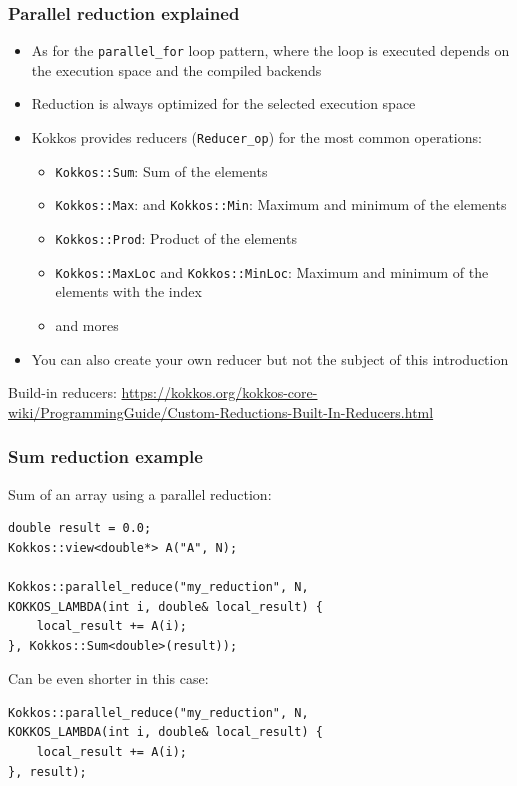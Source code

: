\documentclass[aspectratio=169]{beamer}
\begin{document}
\begin{frame}[fragile]
    \frametitle{Parallel reduction explained}

\begin{itemize}
    \item As for the \texttt{parallel\_for} loop pattern, where the loop is executed depends on the execution space and the compiled backends
    \item Reduction is always optimized for the selected execution space
    \item Kokkos provides reducers (\texttt{Reducer\_op}) for the most common operations:
    \begin{itemize}
        \item \texttt{Kokkos::Sum}: Sum of the elements
        \item \texttt{Kokkos::Max}: and \texttt{Kokkos::Min}: Maximum and minimum of the elements
        \item \texttt{Kokkos::Prod}: Product of the elements
        \item \texttt{Kokkos::MaxLoc} and \texttt{Kokkos::MinLoc}: Maximum and minimum of the elements with the index
        \item and mores
    \end{itemize}  
    \item You can also create your own reducer but not the subject of this introduction
\end{itemize}

\begin{block}{}
    Build-in reducers: \href{https://kokkos.org/kokkos-core-wiki/ProgrammingGuide/Custom-Reductions-Built-In-Reducers.html}{https://kokkos.org/kokkos-core-wiki/ProgrammingGuide/Custom-Reductions-Built-In-Reducers.html}
\end{block}

\end{frame}


\begin{frame}[fragile]
    \frametitle{Sum reduction example}

Sum of an array using a parallel reduction:

\footnotesize
\begin{verbatim}
double result = 0.0;
Kokkos::view<double*> A("A", N);

Kokkos::parallel_reduce("my_reduction", N,
KOKKOS_LAMBDA(int i, double& local_result) {
    local_result += A(i);
}, Kokkos::Sum<double>(result));
\end{verbatim}

\normalsize
Can be even shorter in this case:

\footnotesize
\begin{verbatim}
Kokkos::parallel_reduce("my_reduction", N,
KOKKOS_LAMBDA(int i, double& local_result) {
    local_result += A(i);
}, result);
\end{verbatim}

\end{frame}
\end{document}
